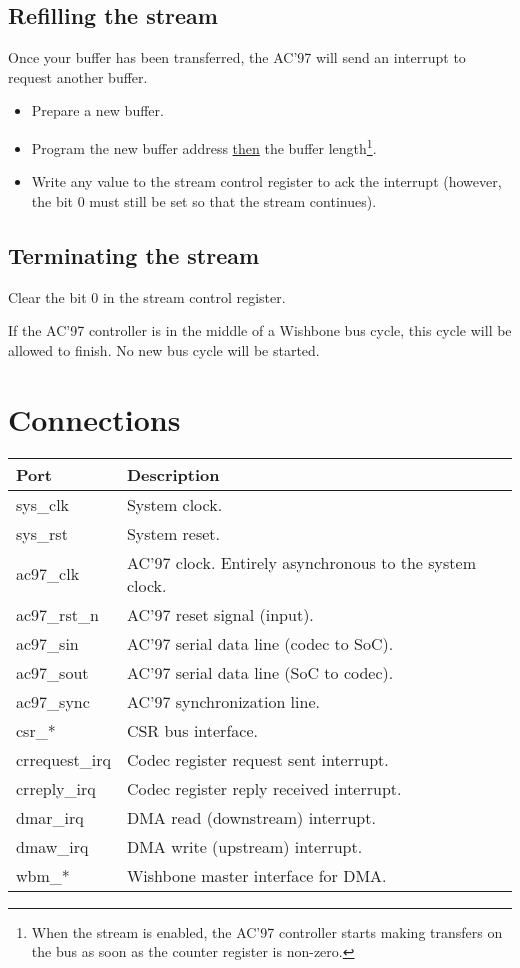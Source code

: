 \documentclass[a4paper,11pt]{article}
\begin{document}
\subsection{Refilling the stream}
Once your buffer has been transferred, the AC'97 will send an interrupt to request another buffer.
\begin{itemize}
\item Prepare a new buffer.
\item Program the new buffer address \underline{then} the buffer length\footnote{When the stream is enabled, the AC'97 controller starts making transfers on the bus as soon as the counter register is non-zero.}.
\item Write any value to the stream control register to ack the interrupt (however, the bit 0 must still be set so that the stream continues).
\end{itemize}

\subsection{Terminating the stream}
Clear the bit 0 in the stream control register.

If the AC'97 controller is in the middle of a Wishbone bus cycle, this cycle will be allowed to finish. No new bus cycle will be started.

\section{Connections}

\begin{tabularx}{\textwidth}{|l|X|}
\hline
\textbf{Port} & \textbf{Description} \\
\hline
sys\_clk & System clock. \\
sys\_rst & System reset. \\
\hline
ac97\_clk & AC'97 clock. Entirely asynchronous to the system clock. \\
ac97\_rst\_n & AC'97 reset signal (input). \\
ac97\_sin & AC'97 serial data line (codec to SoC). \\
ac97\_sout & AC'97 serial data line (SoC to codec). \\
ac97\_sync & AC'97 synchronization line. \\
\hline
csr\_* & CSR bus interface. \\
\hline
crrequest\_irq & Codec register request sent interrupt. \\
crreply\_irq & Codec register reply received interrupt. \\
dmar\_irq & DMA read (downstream) interrupt. \\
dmaw\_irq & DMA write (upstream) interrupt. \\
\hline
wbm\_* & Wishbone master interface for DMA. \\
\hline
\end{tabularx}
\end{document}
